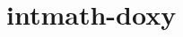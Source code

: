 \chapter{intmath-\/doxy}
\hypertarget{md_README}{}\label{md_README}
\label{md_README_autotoc_md0}%
%
